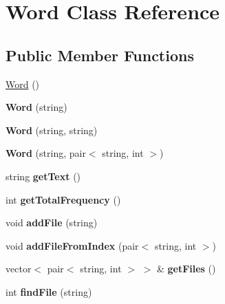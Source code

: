 \hypertarget{classWord}{}\section{Word Class Reference}
\label{classWord}
\subsection*{Public Member Functions}
\begin{DoxyCompactItemize}
\item 
\hyperlink{classWord_a17baf7109d46beb48d5b469f3baedc48}{Word} ()
\item 
{\bfseries Word} (string)\hypertarget{classWord_a056e81505a406c5adaf162a1301ac26a}{}\label{classWord_a056e81505a406c5adaf162a1301ac26a}

\item 
{\bfseries Word} (string, string)\hypertarget{classWord_a9dcb69460aab6992be685095bb9d4182}{}\label{classWord_a9dcb69460aab6992be685095bb9d4182}

\item 
{\bfseries Word} (string, pair$<$ string, int $>$)\hypertarget{classWord_a8b40aae03a062f95d9536a7525463153}{}\label{classWord_a8b40aae03a062f95d9536a7525463153}

\item 
string {\bfseries get\+Text} ()\hypertarget{classWord_a852942b38facba180dde2ac2000bc12a}{}\label{classWord_a852942b38facba180dde2ac2000bc12a}

\item 
int {\bfseries get\+Total\+Frequency} ()\hypertarget{classWord_a5e79039e6f2a3e46483b41e76a1c0da0}{}\label{classWord_a5e79039e6f2a3e46483b41e76a1c0da0}

\item 
void {\bfseries add\+File} (string)\hypertarget{classWord_acbe9749c849eb4c9c749d8fd1ccaaf54}{}\label{classWord_acbe9749c849eb4c9c749d8fd1ccaaf54}

\item 
void {\bfseries add\+File\+From\+Index} (pair$<$ string, int $>$)\hypertarget{classWord_add5d6449544ebf1a9448bfeee8c6b2bc}{}\label{classWord_add5d6449544ebf1a9448bfeee8c6b2bc}

\item 
vector$<$ pair$<$ string, int $>$ $>$ \& {\bfseries get\+Files} ()\hypertarget{classWord_af237de6db5f40f9fe1d594fc1968985d}{}\label{classWord_af237de6db5f40f9fe1d594fc1968985d}

\item 
int {\bfseries find\+File} (string)\hypertarget{classWord_af3144f71602c33e646385db5169fd111}{}\label{classWord_af3144f71602c33e646385db5169fd111}


\end{DoxyCompactItemize}
